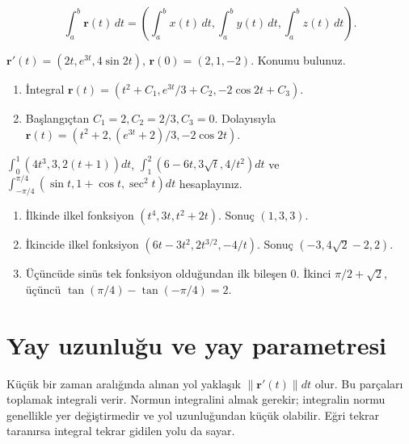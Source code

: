 {\small\[
\int_a^b\mathbf r(t)\,dt=\left(\int_a^b x(t)\,dt,\int_a^b y(t)\,dt,\int_a^b z(t)\,dt\right).
\]}
\begin{tcolorbox}[title={Örnek 3.10 | Başlangıç koşullu integral},colframe=accent]\(\mathbf r\prime(t)=(2t,e^{3t},4\sin2t)\), \(\mathbf r(0)=(2,1,-2)\). Konumu bulunuz.
\par{}\end{tcolorbox}
\begin{tcolorbox}[title={Adım adım çözüm},colback=green!3!white,colframe=green]\begin{enumerate}
\item İntegral \(\mathbf r(t)=(t^2+C_1,e^{3t}/3+C_2,-2\cos2t+C_3)\).
\item Başlangıçtan \(C_1=2,C_2=2/3,C_3=0\). Dolayısıyla \(\mathbf r(t)=(t^2+2,(e^{3t}+2)/3,-2\cos2t)\).
\end{enumerate}\end{tcolorbox}
\begin{tcolorbox}[title={Örnek 3.11 | Dersteki belirli integral üçlüsü},colframe=accent]\(\int_0^1(4t^3,3,2(t+1))dt\), \(\int_1^2(6-6t,3\sqrt t,4/t^2)dt\) ve \(\int_{-\pi/4}^{\pi/4}(\sin t,1+\cos t,\sec^2t)dt\) hesaplayınız.
\par{}\end{tcolorbox}
\begin{tcolorbox}[title={Adım adım çözüm},colback=green!3!white,colframe=green]\begin{enumerate}
\item İlkinde ilkel fonksiyon \((t^4,3t,t^2+2t)\). Sonuç \((1,3,3)\).
\item İkincide ilkel fonksiyon \((6t-3t^2,2t^{3/2},-4/t)\). Sonuç \((-3,4\sqrt2-2,2)\).
\item Üçüncüde sinüs tek fonksiyon olduğundan ilk bileşen 0. İkinci \(\pi/2+\sqrt2\), üçüncü \(\tan(\pi/4)-\tan(-\pi/4)=2\).
\end{enumerate}\end{tcolorbox}
\section{Yay uzunluğu ve yay parametresi}
Küçük bir zaman aralığında alınan yol yaklaşık \(\|\mathbf r\prime(t)\|dt\) olur. Bu parçaları toplamak integrali verir. Normun integralini almak gerekir; integralin normu genellikle yer değiştirmedir ve yol uzunluğundan küçük olabilir. Eğri tekrar taranırsa integral tekrar gidilen yolu da sayar.


